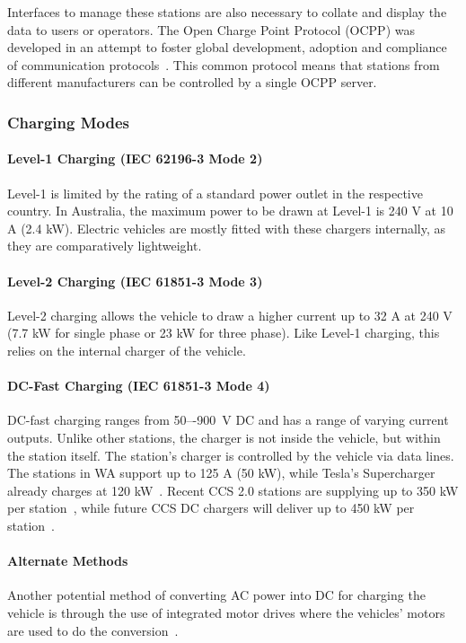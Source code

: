Interfaces to manage these stations are also necessary to collate and display the data to users or operators. The Open Charge Point Protocol (OCPP) was developed in an attempt to foster global development, adoption and compliance of communication protocols~\cite{open_charge_alliance_ocpp_nodate}. This common protocol means that stations from different manufacturers can be controlled by a single OCPP server. 

\subsubsection{Charging Modes}
\paragraph{Level-1 Charging (IEC 62196-3 Mode 2)}
Level-1 is limited by the rating of a standard power outlet in the respective country. In Australia, the maximum power to be drawn at Level-1 is 240 V at 10 A (2.4 kW). Electric vehicles are mostly fitted with these chargers internally, as they are comparatively lightweight.

\paragraph{Level-2 Charging (IEC 61851-3 Mode 3)}
Level-2 charging allows the vehicle to draw a higher current up to 32 A at 240 V (7.7 kW for single phase or 23 kW for three phase). Like Level-1 charging, this relies on the internal charger of the vehicle.

\paragraph{DC-Fast Charging (IEC 61851-3 Mode 4)}
DC-fast charging ranges from 50–-900~V DC and has a range of varying current outputs. Unlike other stations, the charger is not inside the vehicle, but within the station itself. The station's charger is controlled by the vehicle via data lines. The stations in WA support up to 125 A (50 kW), while Tesla's Supercharger already charges at 120 kW~\cite{tesla_supercharger_nodate}. Recent CCS 2.0 stations are supplying up to 350 kW per station~\cite{charging_interface_initiative_e._v._ccs_2018}, while future CCS DC chargers will deliver up to 450 kW per station~\cite{lambert_bmw_2017, kane_fastcharge_2017}.

\paragraph{Alternate Methods}
Another potential method of converting AC power into DC for charging the vehicle is through the use of integrated motor drives where the vehicles' motors are used to do the conversion~\cite{johansen_fast-charging_2013}. 

